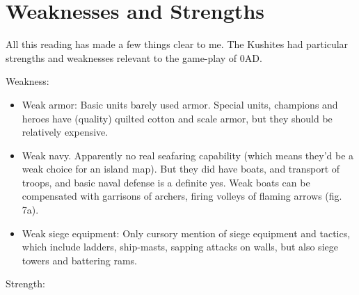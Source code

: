 \documentclass[a4paper,12pt]{scrreprt}
\begin{document}
\section{Weaknesses and Strengths}

All this reading has made a few things clear to me. The Kushites had particular strengths and weaknesses relevant to the game-play of 0AD.

Weakness:

\begin{itemize}
	\item Weak armor: Basic units barely used armor. Special units, champions and heroes have (quality) quilted cotton and scale armor, but they should be relatively expensive.
	\item Weak navy. Apparently no real seafaring capability (which means they’d be a weak choice for an island map). But they did have boats, and transport of troops, and basic naval defense is a definite yes. Weak boats can be compensated with garrisons of archers, firing volleys of flaming arrows (fig. 7a).
	\item Weak siege equipment: Only cursory mention of siege equipment and tactics, which include ladders, ship-masts, sapping attacks on walls, but also siege towers and battering rams.
\end{itemize}

Strength:
\end{document}
